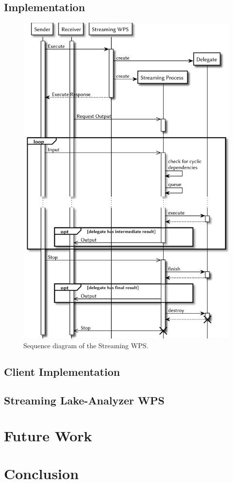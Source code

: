 	\subsection{Implementation}
	\begin{figure}[!htb]
		\centering
		\includegraphics[width=.7868\textwidth]{figures/sequence-diagramm-swps.pdf}
		\caption{\label{fig:sd:swps} Sequence diagram of the Streaming WPS.}
	\end{figure}
	\subsection{Client Implementation}
	\subsection{Streaming Lake-Analyzer WPS}
\section{Future Work}
\section{Conclusion}
